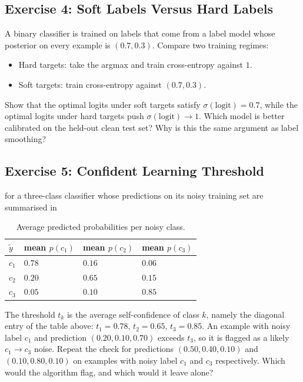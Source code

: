 \subsection{Exercise 4: Soft Labels Versus Hard Labels}

 A binary classifier is trained on labels that come from a label model whose posterior on every example is $(0.7, 0.3)$. Compare two training regimes:
\begin{itemize}
    \item Hard targets: take the argmax and train cross-entropy against $1$.
    \item Soft targets: train cross-entropy against $(0.7, 0.3)$.
\end{itemize}

 Show that the optimal logits under soft targets satisfy $\sigma(\text{logit}) = 0.7$, while the optimal logits under hard targets push $\sigma(\text{logit}) \to 1$. Which model is better calibrated on the held-out clean test set? Why is this the same argument as label smoothing?

\subsection{Exercise 5: Confident Learning Threshold}

 for a three-class classifier whose predictions on its noisy training set are summarised in
\begin{table}[ht]
\centering
\begin{tabular}{p{}p{}p{}p{}}
    \toprule
    \textbf{$\tilde y$} & \textbf{mean $p(c_1)$} & \textbf{mean $p(c_2)$} & \textbf{mean $p(c_3)$} \\
    \midrule
    $c_1$ & $0.78$ & $0.16$ & $0.06$ \\
    $c_2$ & $0.20$ & $0.65$ & $0.15$ \\
    $c_3$ & $0.05$ & $0.10$ & $0.85$ \\
    \bottomrule
\end{tabular}
\vspace{2em}
\caption{Average predicted probabilities per noisy class.}
\label{tab:cl_thresholds}
\end{table}

 The threshold $t_k$ is the average self-confidence of class $k$, namely the diagonal entry of the table above: $t_1 = 0.78$, $t_2 = 0.65$, $t_3 = 0.85$. An example with noisy label $c_1$ and prediction $(0.20, 0.10, 0.70)$ exceeds $t_3$, so it is flagged as a likely $c_1 \to c_3$ noise. Repeat the check for predictions $(0.50, 0.40, 0.10)$ and $(0.10, 0.80, 0.10)$ on examples with noisy label $c_1$ and $c_3$ respectively. Which would the algorithm flag, and which would it leave alone?


